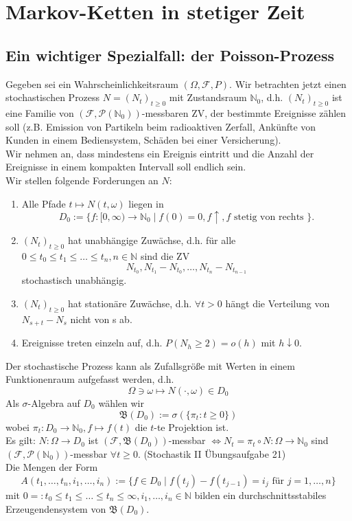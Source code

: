 \documentclass[a4paper,twoside,DIV15,BCOR12mm]{scrbook}
\newcommand{\cF}{\mathcal F}
\newcommand{\borel}{{\mathfrak B}}
\begin{document}
\chapter{Markov-Ketten in stetiger Zeit}

\section{Ein wichtiger Spezialfall: der Poisson-Prozess}

Gegeben sei ein Wahrscheinlichkeitsraum $(\Omega,\cF,P)$.
Wir betrachten jetzt einen stochastischen Prozess $N=(N_t)_{t\geq 0}$
mit Zustandsraum $\mathbb{N}_0$, d.h. $(N_t)_{t\geq 0}$ ist eine Familie von
$(\cF,\mathcal{P}(\mathbb{N}_0))$-messbaren ZV, der bestimmte Ereignisse zählen soll
(z.B. Emission von Partikeln beim radioaktiven Zerfall, Ankünfte von Kunden in einem
Bediensystem, Schäden bei einer Versicherung). \\
Wir nehmen an, dass mindestens ein Ereignis eintritt und die Anzahl der Ereignisse in einem
kompakten Intervall soll endlich sein. \\
Wir stellen folgende Forderungen an $N$:
\begin{enumerate}[\hspace{1em}{(A}1)]
\item Alle Pfade $t \mapsto N(t,\omega)$ liegen in
\[
D_0:=\{f:[0,\infty)\longrightarrow\mathbb{N}_0\mid f(0)=0,f\uparrow,f \text{ stetig von rechts }\}.
\]
\item $(N_t)_{t\geq 0}$ hat unabhängige Zuwächse, d.h. für alle 
$0\leq t_0\leq t_1 \leq \dots \leq t_n, n\in \mathbb{N}$ sind die ZV
\[
N_{t_0},N_{t_1}-N_{t_0},\dots,N_{t_n}-N_{t_{n-1}}
\]
stochastisch unabhängig.
\item $(N_t)_{t\geq 0}$ hat stationäre Zuwächse, d.h. $\forall t>0$ hängt die Verteilung
von $N_{s+t}-N_s$ nicht von s ab.
\item Ereignisse treten einzeln auf, d.h. $P(N_h\geq2)=o(h)$ mit $h\downarrow 0$.
\end{enumerate}
\begin{bemerkung}
  Der stochastische Prozess kann als Zufallsgröße mit Werten in einem
  Funktionenraum aufgefasst werden, d.h.
  \[
  \Omega\ni\omega\mapsto N(\cdot,\omega)\in D_0
  \]
  Als $\sigma$-Algebra auf $D_0$ wählen wir 
  \[
  \borel(D_0):=\sigma(\{\pi_t:t\geq 0\})
  \]
  wobei $\pi_t:D_0\longrightarrow\mathbb{N}_0,f\mapsto f(t)$ die $t$-te Projektion ist. \\
  Es gilt: $N:\Omega\longrightarrow D_0$ ist $(\cF,\borel(D_0))$-messbar 
  $\Longleftrightarrow N_t=\pi_t \circ N:\Omega\longrightarrow\mathbb{N}_0$ sind 
  $(\cF,\mathcal P(\mathbb N_0))$-messbar $\forall t\geq0$. 
  (Stochastik II Übungsaufgabe 21) \\
  Die Mengen der Form
  \[
  A(t_1,\dots,t_n,i_1,\dots,i_n):=\{f\in D_0\mid f(t_j)-f(t_{j-1})=i_j \text{ für } j=1,\dots,n\}
  \]
  mit $0=:t_0\leq t_1\leq\dots\leq t_n\leq\infty,i_1,\dots,i_n\in\mathbb N$ 
  bilden ein durchschnittsstabiles Erzeugendensystem von $\borel(D_0)$.
\end{bemerkung}
\end{document}
